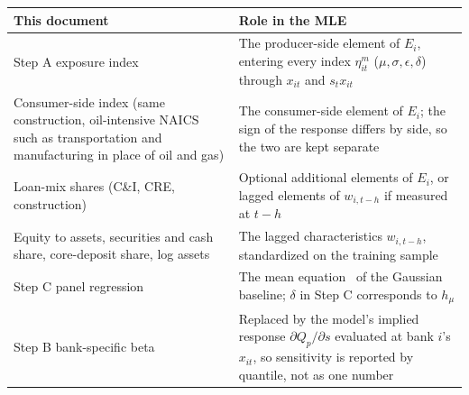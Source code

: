 \documentclass[11pt]{article}
\begin{document}
\begin{tabularx}{\textwidth}{@{}>{\raggedright\arraybackslash}p{4.3cm}X@{}}
\toprule
\textbf{This document} & \textbf{Role in the MLE}\\
\midrule
Step A exposure index & The producer-side element of $E_i$, entering every index $\eta^m_{it}$ ($\mu,\sigma,\epsilon,\delta$) through $x_{it}$ and $s_t x_{it}$\\
Consumer-side index (same construction, oil-intensive NAICS such as transportation and manufacturing in place of oil and gas) & The consumer-side element of $E_i$; the sign of the response differs by side, so the two are kept separate\\
Loan-mix shares (C\&I, CRE, construction) & Optional additional elements of $E_i$, or lagged elements of $w_{i,t-h}$ if measured at $t-h$\\
Equity to assets, securities and cash share, core-deposit share, log assets & The lagged characteristics $w_{i,t-h}$, standardized on the training sample\\
Step C panel regression & The mean equation \ of the Gaussian baseline; $\delta$ in Step C corresponds to $h_\mu$\\
Step B bank-specific beta & Replaced by the model's implied response $\partial Q_p/\partial s$ evaluated at bank $i$'s $x_{it}$, so sensitivity is reported by quantile, not as one number\\
\bottomrule
\end{tabularx}
\end{document}
